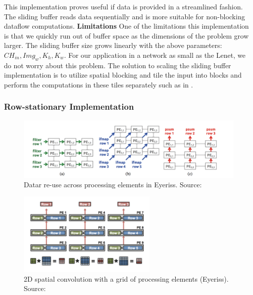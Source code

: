 This implementation proves useful if data is provided in a streamlined fashion. The sliding buffer reads data sequentially and is more suitable for non-blocking dataflow computations.
\newline
\textbf{Limitations}
\newline
One of the limitations this implementation is that we quickly run out of buffer space as the dimensions of the problem grow larger. The sliding buffer size grows linearly with the above parameters: $ CH_{in}, Img_{w}, K_h, K_w $. For our application in a network as small as the Lenet, we do not worry about this problem. The solution to scaling the sliding buffer implementation is to utilize spatial blocking and tile the input into blocks and perform the computations in these tiles separately such as in \cite{2018combined}.

\subsubsection{Row-stationary Implementation} \label{rowimpl}

\begin{figure}[h]
\centering
\includegraphics[width=1.0\textwidth]{Figures/eyeriss}
\decoRule
\caption[Data Re-use in Eyeriss]{ Datar re-use across processing elements in Eyeriss. Source: \cite{eyeriss}}
\label{fig:eyeriss}
\end{figure}

\begin{figure}[h]
\centering
\includegraphics[width=0.6\textwidth]{Figures/eyeriss2}
\decoRule
\caption[2D Spatial Convolution]{ 2D spatial convolution with a grid of processing elements (Eyeriss). Source: \cite{sze2017efficient}}
\label{fig:eyeriss2}
\end{figure}


